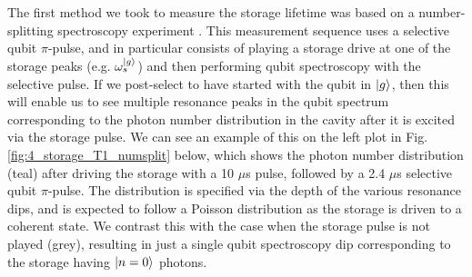 The first method we took to measure the storage lifetime was based on a number-splitting spectroscopy experiment \cite{schuster2007resolving}. This measurement sequence uses a selective qubit $\pi$-pulse, and in particular consists of playing a storage drive at one of the storage peaks (e.g. $\omega_s^{\lvert g\rangle}$) and then performing qubit spectroscopy with the selective pulse. If we post-select to have started with the qubit in $\lvert g\rangle$, then this will enable us to see multiple resonance peaks in the qubit spectrum corresponding to the photon number distribution in the cavity after it is excited via the storage pulse. We can see an example of this on the left plot in Fig. \ref{fig:4_storage_T1_numsplit} below, which shows the photon number distribution (teal) after driving the storage with a 10 $\mu$s pulse, followed by a 2.4 $\mu$s selective qubit $\pi$-pulse. The distribution is specified via the depth of the various resonance dips, and is expected to follow a Poisson distribution as the storage is driven to a coherent state. We contrast this with the case when the storage pulse is not played (grey), resulting in just a single qubit spectroscopy dip corresponding to the storage having $\lvert n=0\rangle$ photons. 

